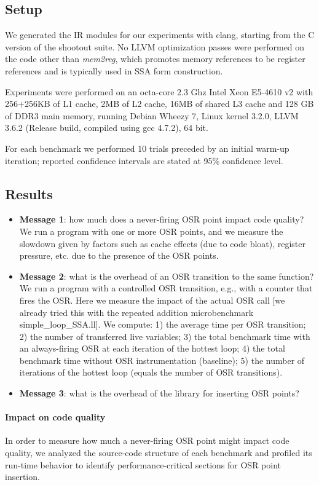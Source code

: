 \subsection{Setup}

We generated the IR modules for our experiments with clang, starting from the C version of the shootout suite. No LLVM optimization passes were performed on the code other than {\em mem2reg}, which promotes memory references to be register references and is typically used in SSA form construction.

Experiments were performed on an octa-core 2.3 Ghz Intel Xeon E5-4610 v2 with 256+256KB of L1 cache, 2MB of L2 cache, 16MB of shared L3 cache and 128 GB of DDR3 main memory, running Debian Wheezy 7, Linux kernel 3.2.0, LLVM 3.6.2 (Release build, compiled using gcc 4.7.2), 64 bit.

For each benchmark we performed 10 trials preceded by an initial warm-up iteration; reported confidence intervals are stated at 95\% confidence level.

\subsection{Results}

\begin{itemize}
\item {\bf Message 1}: how much does a never-firing OSR point impact code quality? We run a program with one or more OSR points, and we measure the slowdown given by factors such as cache effects (due to code bloat), register pressure, etc. due to the presence of the OSR points.
\item {\bf Message 2}: what is the overhead of an OSR transition to the same function? We run a program with a controlled OSR transition, e.g., with a counter that fires the OSR. Here we measure the impact of the actual OSR call [we already tried this with the repeated addition microbenchmark simple\_loop\_SSA.ll]. We compute: 1) the average time per OSR transition; 2) the number of transferred live variables; 3) the total benchmark time with an always-firing OSR at each iteration of the hottest loop; 4) the total benchmark time without OSR instrumentation (baseline); 5) the number of iterations of the hottest loop (equals the number of OSR transitions).
\item {\bf Message 3}: what is the overhead of the library for inserting OSR points? 
\end{itemize}

\paragraph{Impact on code quality}
In order to measure how much a never-firing OSR point might impact code quality, we analyzed the source-code structure of each benchmark and profiled its run-time behavior to identify performance-critical sections for OSR point insertion.

